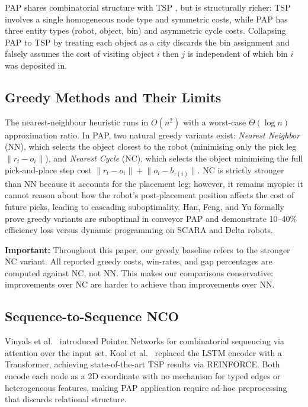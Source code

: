 \documentclass[conference]{IEEEtran}
\begin{document}
PAP shares combinatorial structure with TSP \cite{dantzig1954}, but is structurally richer: TSP involves a single homogeneous node type and symmetric costs, while PAP has three entity types (robot, object, bin) and asymmetric cycle costs. Collapsing PAP to TSP by treating each object as a city discards the bin assignment and falsely assumes the cost of visiting object $i$ then $j$ is independent of which bin $i$ was deposited in.

\subsection{Greedy Methods and Their Limits}

The nearest-neighbour heuristic \cite{rosenkrantz1977} runs in $O(n^2)$ with a worst-case $\Theta(\log n)$ approximation ratio. In PAP, two natural greedy variants exist: \emph{Nearest Neighbor} (NN), which selects the object closest to the robot (minimising only the pick leg $\lVert r_t - o_i \rVert$), and \emph{Nearest Cycle} (NC), which selects the object minimising the full pick-and-place step cost $\lVert r_t - o_i \rVert + \lVert o_i - b_{\tau(i)} \rVert$. NC is strictly stronger than NN because it accounts for the placement leg; however, it remains myopic: it cannot reason about how the robot's post-placement position affects the cost of future picks, leading to cascading suboptimality. Han, Feng, and Yu \cite{han2019pap} formally prove greedy variants are suboptimal in conveyor PAP and demonstrate 10--40\% efficiency loss versus dynamic programming on SCARA and Delta robots.

\textbf{Important:} Throughout this paper, our greedy baseline refers to the stronger NC variant. All reported greedy costs, win-rates, and gap percentages are computed against NC, not NN. This makes our comparisons conservative: improvements over NC are harder to achieve than improvements over NN.

\subsection{Sequence-to-Sequence NCO}

Vinyals et al.\ \cite{vinyals2015pointer} introduced Pointer Networks for combinatorial sequencing via attention over the input set. Kool et al.\ \cite{kool2019attention} replaced the LSTM encoder with a Transformer, achieving state-of-the-art TSP results via REINFORCE. Both encode each node as a 2D coordinate with no mechanism for typed edges or heterogeneous features, making PAP application require ad-hoc preprocessing that discards relational structure.
\end{document}
